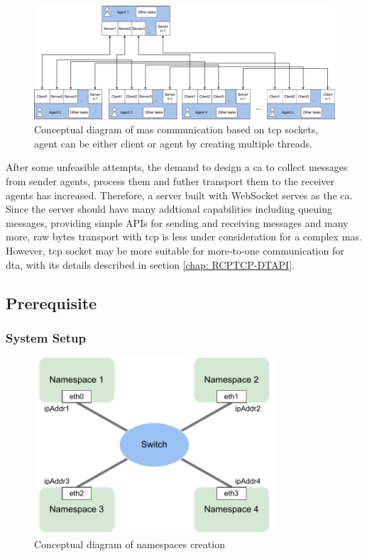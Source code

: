\begin{figure}[htb]
    \includegraphics[width=\textwidth]{figures/threads_MAS.pdf}
    \centering
    \caption{Conceptual diagram of \gls{mas} communication based on 
    \gls{tcp} sockets, agent can be either client or agent by creating 
    multiple threads. \label{fig: threadMASConceptual}}
\end{figure}



After some unfeasible attempts, the demand to design a \gls{ca} to collect 
messages from sender agents, process them and futher transport them to the 
receiver agents has increased. Therefore, a server built with WebSocket serves 
as the \gls{ca}. Since the server should have many addtional 
capabilities including queuing messages, providing simple APIs for sending 
and receiving messages and many more, raw bytes transport with \gls{tcp} is 
less under consideration for a complex \gls{mas}. However, \gls{tcp} socket 
may be more suitable for more-to-one communication for \gls{dta}, 
with its details described in section \ref{chap: RCPTCP-DTAPI}.  


\subsection{Prerequisite}
\subsubsection{System Setup}
 
\begin{figure}[htbp]
\includegraphics[width=0.8\textwidth]{figures/NamespaceConceptual.pdf}
\centering
\caption{Conceptual diagram of namespaces creation
\label{fig: NSConceptual}}
\end{figure}

